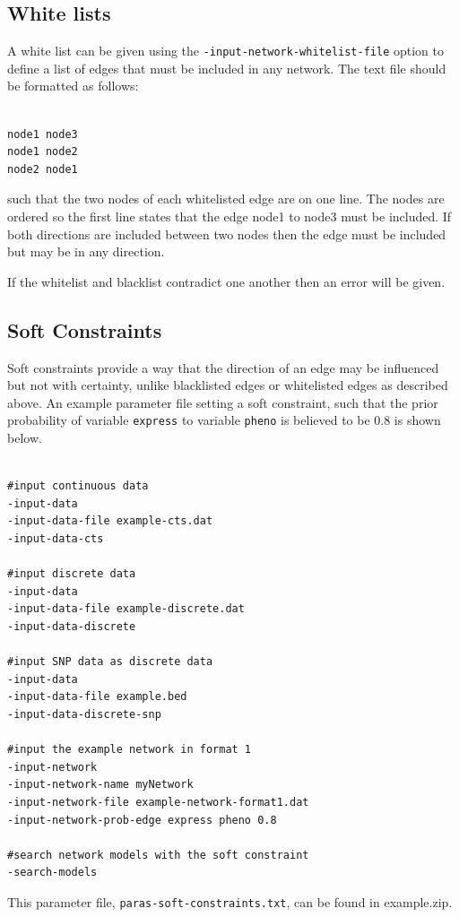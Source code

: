 \documentclass[a4paper,12pt]{article}
\newcommand{\code}[1]{{\footnotesize{{\tt #1}}}}
\begin{document}

\subsection{White lists}
\label{input-network-white}

A white list can be given using the \code{-input-network-whitelist-file} option to define a list of edges that must be included in any network. The text file should be formatted as follows: 
\vspace{0.35cm} \begin{lstlisting}

node1 node3
node1 node2
node2 node1

\end{lstlisting} \vspace{0.35cm}
such that the two nodes of each whitelisted edge are on one line. The nodes are ordered so the first line states that the edge node1 to node3 must be included. If both directions are included between two nodes then the edge must be included but may be in any direction. 

If the whitelist and blacklist contradict one another then an error will be given. 


\subsection{Soft Constraints}
\label{input-network-soft-con}

Soft constraints provide a way that the direction of an edge may be influenced but not with certainty, unlike blacklisted edges or whitelisted edges as described above. An example parameter file setting a soft constraint, such that the prior probability of variable \code{express} to variable \code{pheno} is believed to be 0.8 is shown below. 
\vspace{0.35cm} \begin{lstlisting}

#input continuous data
-input-data
-input-data-file example-cts.dat
-input-data-cts

#input discrete data
-input-data
-input-data-file example-discrete.dat
-input-data-discrete

#input SNP data as discrete data
-input-data
-input-data-file example.bed
-input-data-discrete-snp

#input the example network in format 1
-input-network
-input-network-name myNetwork
-input-network-file example-network-format1.dat
-input-network-prob-edge express pheno 0.8

#search network models with the soft constraint
-search-models

\end{lstlisting} \vspace{0.35cm}
This parameter file, \code{paras-soft-constraints.txt}, can be found in example.zip.
\end{document}
